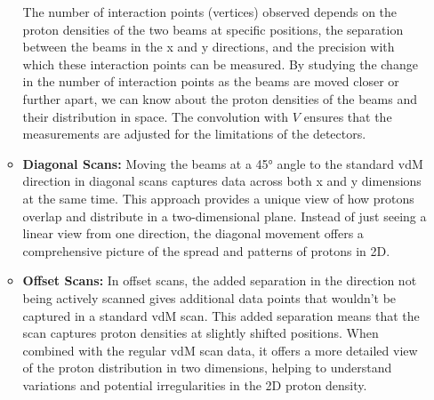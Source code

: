 \begin{itemize}
\begin{itemize}
The number of interaction points (vertices) observed depends on the proton densities of the two beams at specific positions, the separation between the beams in the x and y directions, and the precision with which these interaction points can be measured. By studying the change in the number of interaction points as the beams are moved closer or further apart, we can know about the proton densities of the beams and their distribution in space. The convolution with \(V\) ensures that the measurements are adjusted for the limitations of the detectors.


\item \textbf{Diagonal Scans:} Moving the beams at a 45° angle to the standard vdM direction in diagonal scans captures data across both x and y dimensions at the same time. This approach provides a unique view of how protons overlap and distribute in a two-dimensional plane. Instead of just seeing a linear view from one direction, the diagonal movement offers a comprehensive picture of the spread and patterns of protons in 2D.

\item \textbf{Offset Scans:} In offset scans, the added separation in the direction not being actively scanned gives additional data points that wouldn't be captured in a standard vdM scan. This added separation means that the scan captures proton densities at slightly shifted positions. When combined with the regular vdM scan data, it offers a more detailed view of the proton distribution in two dimensions, helping to understand variations and potential irregularities in the 2D proton density.



\end{itemize}
\end{itemize}
